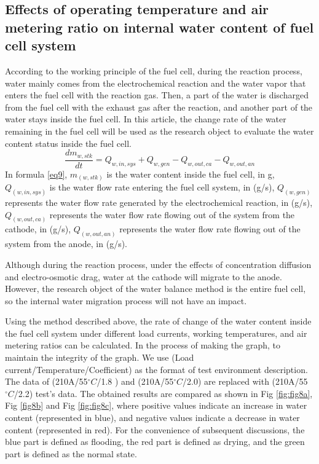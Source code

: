 \subsection{Effects of operating temperature and air metering ratio on internal water content of fuel cell system}
According to the working principle of the fuel cell, during the reaction process, water mainly comes from the electrochemical reaction and the water vapor that enters the fuel cell with the reaction gas. Then, a part of the water is discharged from the fuel cell with the exhaust gas after the reaction, and another part of the water stays inside the fuel cell. In this article, the change rate of the water remaining in the fuel cell will be used as the research object to evaluate the water content status inside the fuel cell.
\begin{equation}
	\label{eq9}
	{\frac{d m_{w,s t k}}{d t}}=Q_{w,i n,s y s}+Q_{w,g e n}-Q_{w,o u t,c a}-Q_{w,o u t,a n}
\end{equation}
In formula \ref{eq9}, $m_(w,stk)$ is the water content inside the fuel cell, in g, $Q_(w,in,sys)$ is the water flow rate entering the fuel cell system, in (g/s), $Q_(w,gen)$ represents the water flow rate generated by the electrochemical reaction, in (g/s), $Q_(w,out,ca)$ represents the water flow rate flowing out of the system from the cathode, in (g/s), $Q_(w,out,an)$ represents the water flow rate flowing out of the system from the anode, in (g/s).
\par
Although during the reaction process, under the effects of concentration diffusion and electro-osmotic drag, water at the cathode will migrate to the anode. However, the research object of the water balance method is the entire fuel cell, so the internal water migration process will not have an impact.
\par
Using the method described above, the rate of change of the water content inside the fuel cell system under different load currents, working temperatures, and air metering ratios can be calculated. In the process of making the graph, to maintain the integrity of the graph. We use (Load current/Temperature/Coefficient) as the format of test environment description. The data of (210A/55$^{\circ}C$/1.8 ) and (210A/55$^{\circ}C$/2.0) are replaced with (210A/55$^{\circ}C$/2.2) test's data. The obtained results are compared as shown in Fig \ref{fig:fig8a}, Fig \ref{fig8b} and Fig \ref{fig:fig8c}, where positive values indicate an increase in water content (represented in blue), and negative values indicate a decrease in water content (represented in red). For the convenience of subsequent discussions, the blue part is defined as flooding, the red part is defined as drying, and the green part is defined as the normal state.

